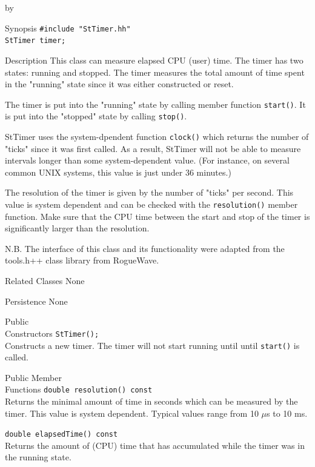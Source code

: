 \documentclass[twoside]{article}
\newcommand{\comp}[1]{\texttt{#1}}%
\newcommand{\entrylabel}[1]{\mbox{\textbf{{#1}}}\hfil}%
\newenvironment{entry}
{\begin{list}{}%
    {\renewcommand{\makelabel}{\entrylabel}%
     \setlength{\labelwidth}{90pt}%
     \setlength{\leftmargin}{\labelwidth}
     \advance\leftmargin by \labelsep%
      }%
    }%
  {\end{list}}
\newcommand{\Entrylabel}[1]%
{\raisebox{0pt}[1ex][0pt]{\makebox[\labelwidth][l]%
    {\parbox[t]{\labelwidth}{\hspace{0pt}\textbf{{#1}}}}}}
\newenvironment{Entry}%
{\renewcommand{\entrylabel}{\Entrylabel}\begin{entry}}%
  {\end{entry}}
\begin{document}
\begin{description}
\begin{Entry}
\item[Synopsis]
    \verb+#include "StTimer.hh"+ \\
    \verb+StTimer timer;+
    
\item[Description]    
    This class can measure elapsed CPU (user) time. The timer has two
    states: running and stopped. The timer measures the total amount
    of time spent in the "running" state since it was either
    constructed or reset.
    
    The timer is put into the "running" state by calling member
    function \comp{start()}. It is put into the "stopped" state by
    calling \comp{stop()}.
    
    StTimer uses the system-dpendent function \comp{clock()} which
    returns the number of "ticks" since it was first called. As a
    result, StTimer will not be able to measure intervals longer than
    some system-dependent value. (For instance, on several common UNIX
    systems, this value is just under 36 minutes.)
    
    The resolution of the timer is given by the number of "ticks" per
    second.  This value is system dependent and can be checked with
    the \comp{resolution()} member function. Make sure that the CPU time
    between the start and stop of the timer is significantly larger
    than the resolution.

    N.B. The interface of this class and its functionality were adapted
    from the tools.h++ class library from RogueWave.
    
\item[Related Classes]
    None
    
\item[Persistence]
    None
    
\item[Public\\ Constructors]
    \verb+StTimer();+ \\
    Constructs a new timer. The timer will not start
    running until until \comp{start()} is called.

\item[Public Member\\ Functions]
    \verb+double resolution() const+\\
    Returns the minimal amount of time in seconds which can be
    measured by the timer. This value is system dependent.
    Typical values range from 10 $\mu$s to 10 ms.
    
    \verb+double elapsedTime() const+\\
    Returns the amount of (CPU) time that has accumulated while
    the timer was in the running state.
 

\end{Entry}
\end{description}
\end{document}
